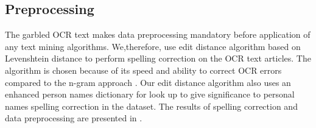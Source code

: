 \subsection{Preprocessing}
The garbled OCR text makes data preprocessing mandatory before application of any text mining algorithms. We,therefore, use edit distance algorithm based on Levenshtein distance to perform spelling correction on the OCR text articles. The algorithm is chosen because of its speed and ability to correct OCR errors compared to the n-gram approach \cite{chattopadhyaya2013fast}. Our edit distance algorithm also uses an enhanced person names dictionary for look up to give significance to personal names spelling correction in the dataset. The results of spelling correction and data preprocessing are presented in \cite{Gupta_14a}.
